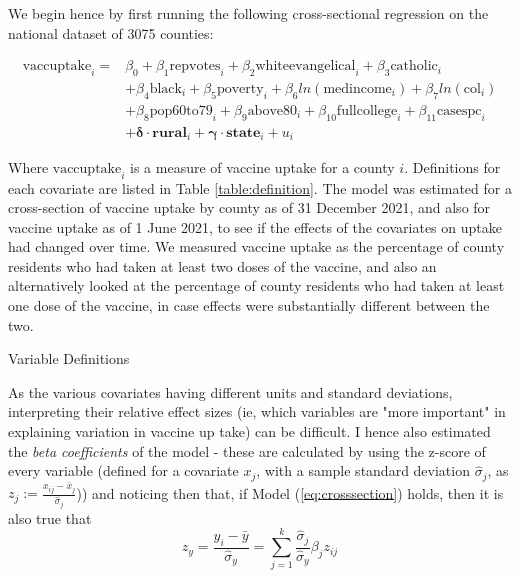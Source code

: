 \documentclass[12pt]{article}
\begin{document}
\begin{spacing}{1.5}
		We begin hence by first running the following cross-sectional regression on the national dataset of 3075 counties:
		
		\begin{equation} \label{eq:crosssection}
			\begin{split}
				\textrm{vaccuptake}_i = &\beta_0 + \beta_1 \textrm{repvotes}_i + \beta_2 \textrm{whiteevangelical}_i + \beta_3 \textrm{catholic}_i \\ 
				&+ \beta_4 \textrm{black}_i + \beta_5 \textrm{poverty}_i + \beta_6 ln(\textrm{medincome}_i) + \beta_7 ln(\textrm{col}_i) \\ 
				&+ \beta_8 \textrm{pop60to79}_i + \beta_9 \textrm{above80}_i + \beta_{10} \textrm{fullcollege}_i + \beta_{11} \textrm{casespc}_i \\
				&+\boldsymbol{\delta}\cdot \mathbf{rural}_i + \boldsymbol{\gamma}\cdot \mathbf{state}_i + u_i
			\end{split}
		\end{equation}
		
		Where $\textrm{vaccuptake}_i$ is a measure of vaccine uptake for a county $i$. Definitions for each covariate are listed in Table \ref{table:definition}. The model was estimated for a cross-section of vaccine uptake by county as of 31 December 2021, and also for vaccine uptake as of 1 June 2021, to see if the effects of the covariates on uptake had changed over time. We measured vaccine uptake as the percentage of county residents who had taken at least two doses of the vaccine, and also an alternatively looked at the percentage of county residents who had taken at least one dose of the vaccine, in case effects were substantially different between the two.
		
		\begin{table}
			\caption{Variable Definitions}
			
			\label{table:definition}
		\end{table}
	
		As the various covariates having different units and standard deviations, interpreting their relative effect sizes (ie, which variables are "more important" in explaining variation in vaccine up take) can be difficult. I hence also estimated the \textit{beta coefficients} of the model - these are calculated by using the z-score of every variable (defined for a covariate $x_j$, with a sample standard deviation $\hat{\sigma}_j$, as $z_j := \frac{x_{ij}-\bar{x}_j}{\hat{\sigma}_j}$)) and noticing then that, if Model (\ref{eq:crosssection}) holds, then it is also true that
		\begin{equation} \label{eq:standardized}
			z_y=\frac{y_i-\bar{y}}{\hat{\sigma}_y} = \sum_{j=1}^{k} \frac{\hat{\sigma}_j}{\hat{\sigma}_y}\beta_j z_{ij}
		\end{equation}
		

\end{spacing}
\end{document}
